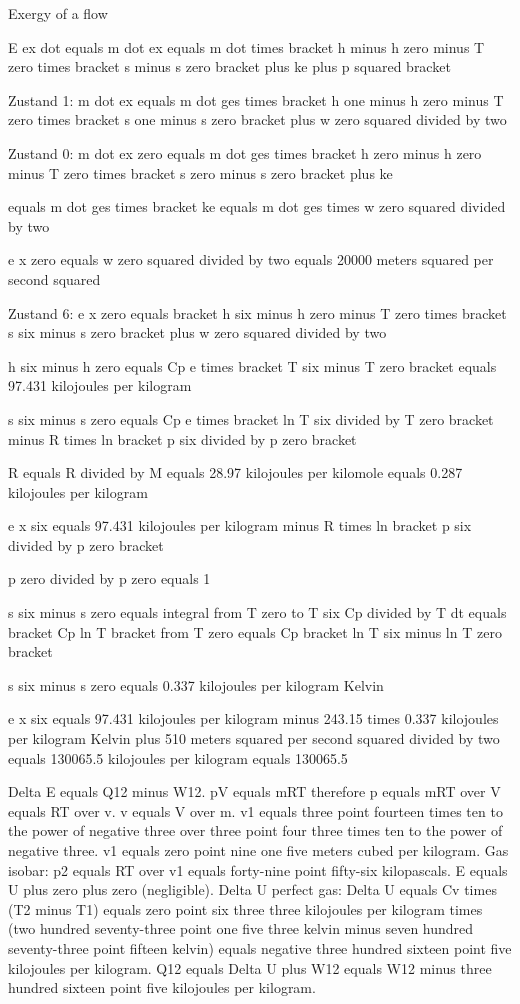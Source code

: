 Exergy of a flow

E ex dot equals m dot ex equals m dot times bracket h minus h zero minus T zero times bracket s minus s zero bracket plus ke plus p squared bracket

Zustand 1: m dot ex equals m dot ges times bracket h one minus h zero minus T zero times bracket s one minus s zero bracket plus w zero squared divided by two

Zustand 0: m dot ex zero equals m dot ges times bracket h zero minus h zero minus T zero times bracket s zero minus s zero bracket plus ke

equals m dot ges times bracket ke equals m dot ges times w zero squared divided by two

e x zero equals w zero squared divided by two equals 20000 meters squared per second squared

Zustand 6: e x zero equals bracket h six minus h zero minus T zero times bracket s six minus s zero bracket plus w zero squared divided by two

h six minus h zero equals Cp e times bracket T six minus T zero bracket equals 97.431 kilojoules per kilogram

s six minus s zero equals Cp e times bracket ln T six divided by T zero bracket minus R times ln bracket p six divided by p zero bracket

R equals R divided by M equals 28.97 kilojoules per kilomole equals 0.287 kilojoules per kilogram

e x six equals 97.431 kilojoules per kilogram minus R times ln bracket p six divided by p zero bracket

p zero divided by p zero equals 1

s six minus s zero equals integral from T zero to T six Cp divided by T dt equals bracket Cp ln T bracket from T zero equals Cp bracket ln T six minus ln T zero bracket

s six minus s zero equals 0.337 kilojoules per kilogram Kelvin

e x six equals 97.431 kilojoules per kilogram minus 243.15 times 0.337 kilojoules per kilogram Kelvin plus 510 meters squared per second squared divided by two equals 130065.5 kilojoules per kilogram equals 130065.5

Delta E equals Q12 minus W12.  
pV equals mRT therefore p equals mRT over V equals RT over v.  
v equals V over m.  
v1 equals three point fourteen times ten to the power of negative three over three point four three times ten to the power of negative three.  
v1 equals zero point nine one five meters cubed per kilogram.  
Gas isobar: p2 equals RT over v1 equals forty-nine point fifty-six kilopascals.  
E equals U plus zero plus zero (negligible).  
Delta U perfect gas: Delta U equals Cv times (T2 minus T1) equals zero point six three three kilojoules per kilogram times (two hundred seventy-three point one five three kelvin minus seven hundred seventy-three point fifteen kelvin) equals negative three hundred sixteen point five kilojoules per kilogram.  
Q12 equals Delta U plus W12 equals W12 minus three hundred sixteen point five kilojoules per kilogram.

